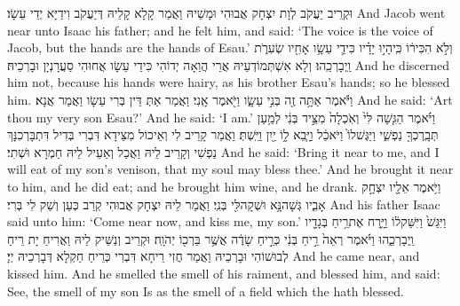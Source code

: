 {וּקְרֵיב יַעֲקֹב לְוָת יִצְחָק אֲבוּהִי וּמָשֵׁיהּ וַאֲמַר קָלָא קָלֵיהּ דְּיַעֲקֹב וִידַיָּא יְדֵי עֵשָׂו׃}
{And Jacob went near unto Isaac his father; and he felt him, and said: ‘The voice is the voice of Jacob, but the hands are the hands of Esau.’}{}
{וְלֹ֣א הִכִּיר֔וֹ כִּֽי\maqqaf הָי֣וּ יָדָ֗יו כִּידֵ֛י עֵשָׂ֥ו אָחִ֖יו שְׂעִרֹ֑ת וַֽיְבָרְכֵֽהוּ׃}
{וְלָא אִשְׁתְּמוֹדְעֵיהּ אֲרֵי הֲוַאָה יְדוֹהִי כִּידֵי עֵשָׂו אֲחוּהִי סַעֲרָנְיָן וּבָרְכֵיהּ׃}
{And he discerned him not, because his hands were hairy, as his brother Esau’s hands; so he blessed him.}{}
{וַיֹּ֕אמֶר אַתָּ֥ה זֶ֖ה בְּנִ֣י עֵשָׂ֑ו וַיֹּ֖אמֶר אָֽנִי׃}
{וַאֲמַר אַתְּ דֵּין בְּרִי עֵשָׂו וַאֲמַר אֲנָא׃}
{And he said: ‘Art thou my very son Esau?’ And he said: ‘I am.’}{}
{וַיֹּ֗אמֶר הַגִּ֤שָׁה לִּי֙ וְאֹֽכְלָה֙ מִצֵּ֣יד בְּנִ֔י לְמַ֥עַן תְּבָֽרֶכְךָ֖ נַפְשִׁ֑י וַיַּגֶּשׁ\maqqaf לוֹ֙ וַיֹּאכַ֔ל וַיָּ֧בֵא ל֦וֹ יַ֖יִן וַיֵּֽשְׁתְּ׃}
{וַאֲמַר קָרֵיב לִי וְאֵיכוֹל מִצֵּידָא דִּבְרִי בְּדִיל דִּתְבָּרְכִנָּךְ נַפְשִׁי וְקָרֵיב לֵיהּ וַאֲכַל וְאַעֵיל לֵיהּ חַמְרָא וּשְׁתִי׃}
{And he said: ‘Bring it near to me, and I will eat of my son’s venison, that my soul may bless thee.’ And he brought it near to him, and he did eat; and he brought him wine, and he drank.}{}
{וַיֹּ֥אמֶר אֵלָ֖יו יִצְחָ֣ק אָבִ֑יו גְּשָׁה\maqqaf נָּ֥א וּשְׁקָה\maqqaf לִּ֖י בְּנִֽי׃}
{וַאֲמַר לֵיהּ יִצְחָק אֲבוּהִי קְרַב כְּעַן וְשַׁק לִי בְּרִי׃}
{And his father Isaac said unto him: ‘Come near now, and kiss me, my son.’}{}
{וַיִּגַּשׁ֙ וַיִּשַּׁק\maqqaf ל֔וֹ וַיָּ֛רַח אֶת\maqqaf רֵ֥יחַ בְּגָדָ֖יו וַֽיְבָרְכֵ֑הוּ וַיֹּ֗אמֶר רְאֵה֙ רֵ֣יחַ בְּנִ֔י כְּרֵ֣יחַ שָׂדֶ֔ה אֲשֶׁ֥ר בֵּרְכ֖וֹ יְהֹוָֽה׃}
{וּקְרֵיב וְנַשֵּׁיק לֵיהּ וַאֲרִיחַ יָת רֵיחַ לְבוּשׁוֹהִי וּבָרְכֵיהּ וַאֲמַר חֲזִי רֵיחָא דִּבְרִי כְּרֵיחַ חַקְלָא דְּבָרְכֵיהּ יְיָ׃}
{And he came near, and kissed him. And he smelled the smell of his raiment, and blessed him, and said: See, the smell of my son Is as the smell of a field which the \lord\space hath blessed.}{}
\newseder
